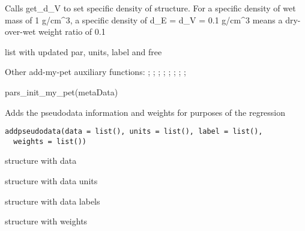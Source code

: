 \documentclass[a4paper]{book}
\begin{document}
%
\begin{Details}\relax
Calls get\_d\_V to set specific density of structure. For a specific density of wet mass of 1 g/cm\textasciicircum{}3,
a specific density of d\_E = d\_V = 0.1 g/cm\textasciicircum{}3 means a dry-over-wet weight ratio of 0.1
\end{Details}
%
\begin{Value}
list with updated par, units, label and free
\end{Value}
%
\begin{SeeAlso}\relax
Other add-my-pet auxiliary functions: ;
; ;
; ;
;
;
; 
\end{SeeAlso}
%
\begin{Examples}
\begin{ExampleCode}
pars_init_my_pet(metaData)
\end{ExampleCode}
\end{Examples}
%
\begin{Description}\relax
Adds the pseudodata information and weights for purposes of the regression
\end{Description}
%
\begin{Usage}
\begin{verbatim}
addpseudodata(data = list(), units = list(), label = list(),
  weights = list())
\end{verbatim}
\end{Usage}
%
\begin{Arguments}
\begin{ldescription}
\item[\code{data}] structure with data

\item[\code{units}] structure with data units

\item[\code{label}] structure with data labels

\item[\code{weights}] structure with weights
\end{ldescription}
\end{Arguments}
\end{document}
